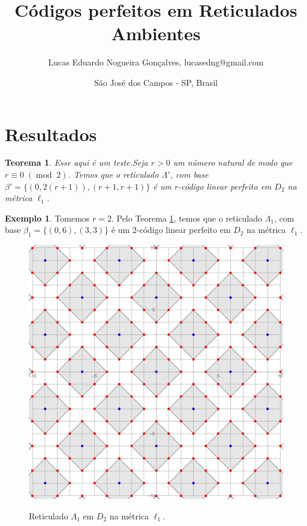 \documentclass{article}
\title{Códigos perfeitos em Reticulados Ambientes}
\author{Lucas Eduardo Nogueira Gonçalves, lucasedng@gmail.com}
\date{São José dos Campos - SP, Brasil}
\theoremstyle{plain}
\newtheorem{theorem}{Teorema}
\theoremstyle{definition}
\newtheorem{example}{Exemplo}
\theoremstyle{remark}
\DeclareMathOperator{\modu}{mod}
\begin{document}
\maketitle

\section{Resultados}

  \begin{theorem}\label{cods1}
    Esse aqui é um teste.Seja $r>0$ um número natural de modo que $r \equiv 0\;(\modu\;2)$. Temos que o reticulado $\Lambda'$, com base $\beta' = \{(0,2(r+1)),(r+1,r+1)\}$ é um $r$-código linear perfeito em $D_2$ na métrica $\ell_1$.
  \end{theorem}

  \begin{example}
    Tomemos $r=2$. Pelo Teorema \ref{cods1}, temos que o reticulado $\Lambda_1$, com base $\beta_1=\{(0,6),(3,3)\}$ é um $2$-código linear perfeito em $D_2$ na métrica $\ell_1$.
    \begin{figure}[h!]
			\centering
        	\includegraphics[scale=0.23]{exampler2l1.pdf} \label{fig1}
          \caption{Reticulado $\Lambda_1$ em $D_2$ na métrica $\ell_1$.}
		\end{figure}
  \end{example}
\end{document}

